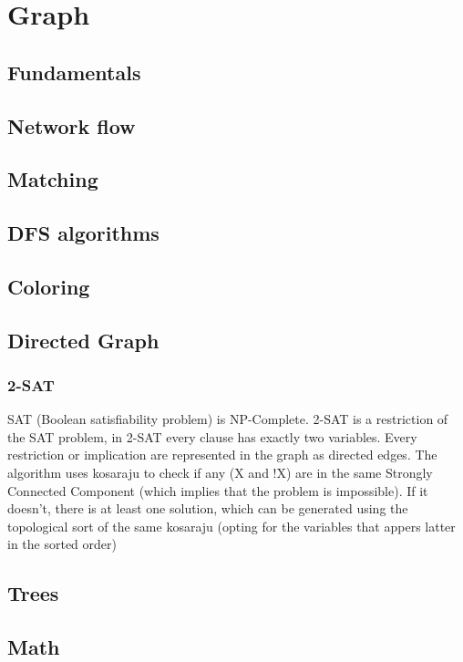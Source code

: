 \chapter{Graph}

\section{Fundamentals}

\section{Network flow}

\section{Matching}

\section{DFS algorithms}

\section{Coloring}

\section{Directed Graph}
	\subsection{2-SAT}
	
		SAT (Boolean satisfiability problem) is NP-Complete.
		2-SAT is a restriction of the SAT problem, in 2-SAT every clause has exactly two variables.
		Every restriction or implication are represented in the graph as directed edges.
		The algorithm uses kosaraju to check if any (X and !X) are in the same Strongly Connected Component 
		(which implies that the problem is impossible). 
		If it doesn't, there is at least one solution, which can be generated using the topological sort of the same kosaraju 
		(opting for the variables that appers latter in the sorted order)


\section{Trees}

\section{Math}
